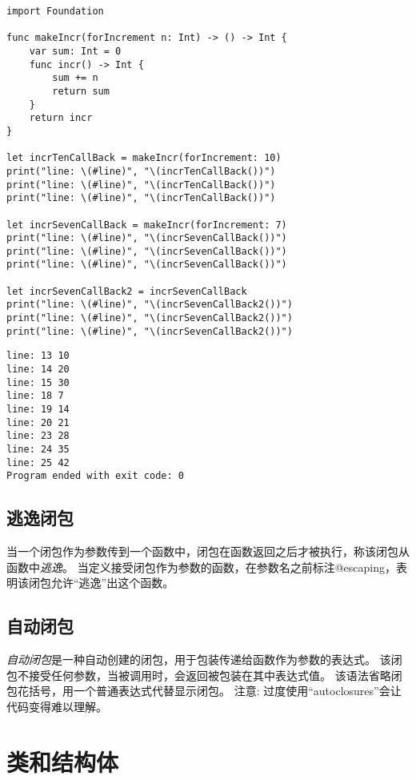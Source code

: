 \documentclass{../main.tex}{subfiles}
\begin{document}
\begin{lstlisting}[style = lstCodeStyleSwift, caption = {值捕获}]
import Foundation

func makeIncr(forIncrement n: Int) -> () -> Int {
    var sum: Int = 0
    func incr() -> Int {
        sum += n
        return sum
    }
    return incr
}

let incrTenCallBack = makeIncr(forIncrement: 10)
print("line: \(#line)", "\(incrTenCallBack())")
print("line: \(#line)", "\(incrTenCallBack())")
print("line: \(#line)", "\(incrTenCallBack())")

let incrSevenCallBack = makeIncr(forIncrement: 7)
print("line: \(#line)", "\(incrSevenCallBack())")
print("line: \(#line)", "\(incrSevenCallBack())")
print("line: \(#line)", "\(incrSevenCallBack())")

let incrSevenCallBack2 = incrSevenCallBack
print("line: \(#line)", "\(incrSevenCallBack2())")
print("line: \(#line)", "\(incrSevenCallBack2())")
print("line: \(#line)", "\(incrSevenCallBack2())")

\end{lstlisting}

\begin{lstlisting}[style = lstCodeStylePlainText, title = {运行结果}]
line: 13 10
line: 14 20
line: 15 30
line: 18 7
line: 19 14
line: 20 21
line: 23 28
line: 24 35
line: 25 42
Program ended with exit code: 0
\end{lstlisting}

\subsection{逃逸闭包}
当一个闭包作为参数传到一个函数中，闭包在函数返回之后才被执行，称该闭包从函数中\emph{逃逸}。
当定义接受闭包作为参数的函数，在参数名之前标注@escaping，表明该闭包允许``逃逸''出这个函数。

\subsection{自动闭包}
\emph{自动闭包}是一种自动创建的闭包，用于包装传递给函数作为参数的表达式。
该闭包不接受任何参数，当被调用时，会返回被包装在其中表达式值。
该语法省略闭包花括号，用一个普通表达式代替显示闭包。
注意: 过度使用``autoclosures''会让代码变得难以理解。

\section{类和结构体}


\end{document}
